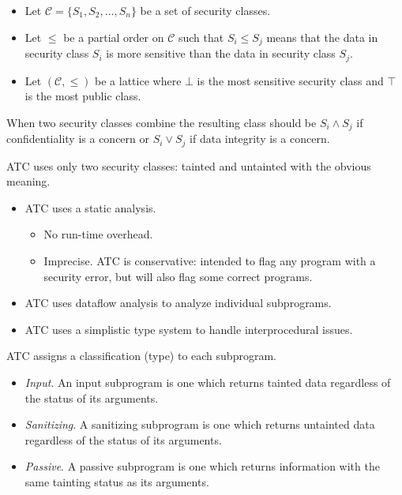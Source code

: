 \documentclass[landscape]{slides}
\begin{document}
\begin{itemize}
\item Let $\mathcal{C} = \{S_1, S_2, \ldots, S_n\}$ be a set of security classes.
\item Let $\le$ be a partial order on $\mathcal{C}$ such that $S_i \le S_j$ means that the data
in security class $S_i$ is more sensitive than the data in security class $S_j$.
\item Let $(\mathcal{C}, \le)$ be a lattice where $\bot$ is the most sensitive security class
and $\top$ is the most public class.
\end{itemize}
When two security classes combine the resulting class should be $S_i \wedge S_j$ if
confidentiality is a concern or $S_i \vee S_j$ if data integrity is a concern.

ATC uses only two security classes: tainted and untainted with the obvious meaning.
\stopslide

\begin{itemize}
\item ATC uses a static analysis.
  \begin{itemize}
  \item No run-time overhead.
  \item Imprecise. ATC is conservative: intended to flag any program with a security error, but
  will also flag some correct programs.
  \end{itemize}
\item ATC uses dataflow analysis to analyze individual subprograms.
\item ATC uses a simplistic type system to handle interprocedural issues.
\end{itemize}
\stopslide

ATC assigns a classification (type) to each subprogram.
\begin{itemize}
\item \textit{Input}. An input subprogram is one which returns tainted data regardless of the
status of its arguments.
\item \textit{Sanitizing}. A sanitizing subprogram is one which returns untainted data
regardless of the status of its arguments.
\item \textit{Passive}. A passive subprogram is one which returns information with the same
tainting status as its arguments.
\end{itemize}
\end{document}
